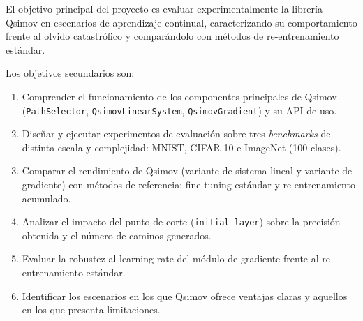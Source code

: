 El objetivo principal del proyecto es evaluar experimentalmente la librería Qsimov en escenarios de
aprendizaje continual, caracterizando su comportamiento frente al olvido catastrófico y
comparándolo con métodos de re-entrenamiento estándar.

Los objetivos secundarios son:

\begin{enumerate}
  \item Comprender el funcionamiento de los componentes principales de Qsimov
        (\texttt{PathSelector}, \texttt{QsimovLinearSystem}, \texttt{QsimovGradient}) y su API de
        uso.
  \item Diseñar y ejecutar experimentos de evaluación sobre tres \textit{benchmarks} de distinta
        escala y complejidad: MNIST, CIFAR-10 e ImageNet (100 clases).
  \item Comparar el rendimiento de Qsimov (variante de sistema lineal y variante de gradiente) con
        métodos de referencia: fine-tuning estándar y re-entrenamiento acumulado.
  \item Analizar el impacto del punto de corte (\texttt{initial\_layer}) sobre la precisión
        obtenida y el número de caminos generados.
  \item Evaluar la robustez al learning rate del módulo de gradiente frente al re-entrenamiento
        estándar.
  \item Identificar los escenarios en los que Qsimov ofrece ventajas claras y aquellos en los que
        presenta limitaciones.
\end{enumerate}
